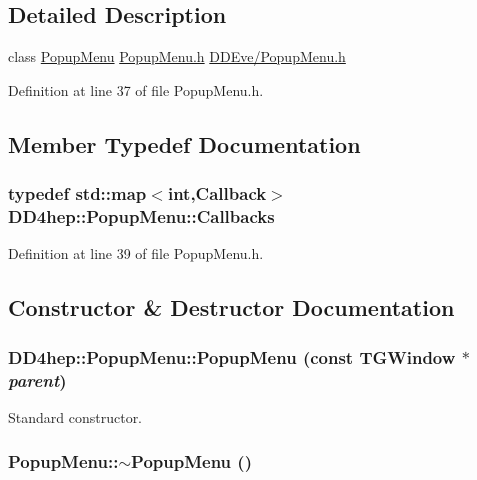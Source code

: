 \subsection{Detailed Description}
class \hyperlink{class_d_d4hep_1_1_popup_menu}{PopupMenu} \hyperlink{_popup_menu_8h}{PopupMenu.h} \hyperlink{_popup_menu_8h}{DDEve/PopupMenu.h} 

Definition at line 37 of file PopupMenu.h.

\subsection{Member Typedef Documentation}
\hypertarget{class_d_d4hep_1_1_popup_menu_aea53283ce44fa4935d8b7a3751ad1b5b}{
\subsubsection[{Callbacks}]{\setlength{\rightskip}{0pt plus 5cm}typedef std::map$<$int,{\bf Callback}$>$ {\bf DD4hep::PopupMenu::Callbacks}}}
\label{class_d_d4hep_1_1_popup_menu_aea53283ce44fa4935d8b7a3751ad1b5b}


Definition at line 39 of file PopupMenu.h.

\subsection{Constructor \& Destructor Documentation}
\hypertarget{class_d_d4hep_1_1_popup_menu_afaf85050694a622a0f3f62e2622bc5e9}{
\subsubsection[{PopupMenu}]{\setlength{\rightskip}{0pt plus 5cm}DD4hep::PopupMenu::PopupMenu (const TGWindow $\ast$ {\em parent})}}
\label{class_d_d4hep_1_1_popup_menu_afaf85050694a622a0f3f62e2622bc5e9}


Standard constructor. \hypertarget{class_d_d4hep_1_1_popup_menu_aabdf2cc11c5e3cb57049041c459082fd}{
\subsubsection[{$\sim$PopupMenu}]{\setlength{\rightskip}{0pt plus 5cm}PopupMenu::$\sim$PopupMenu ()}}
\label{class_d_d4hep_1_1_popup_menu_aabdf2cc11c5e3cb57049041c459082fd}


